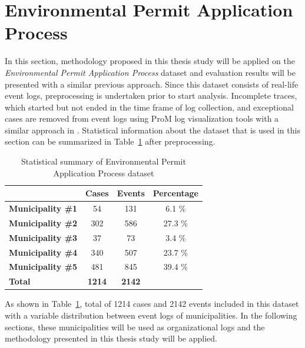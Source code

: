 \section{Environmental Permit Application Process}
\label{sec:environmental-permit-application-process}
In this section, methodology proposed in this thesis study will be applied on the \textit{Environmental Permit Application Process} dataset \cite{coselog-data} and evaluation results will be presented with a similar previous approach. Since this dataset consists of real-life event logs, preprocessing is undertaken prior to start analysis. Incomplete traces, which started but not ended in the time frame of log collection, and exceptional cases are removed from event logs using ProM log visualization tools with a similar approach in \cite{buijs2014flexible}. Statistical information about the dataset that is used in this section can be summarized in Table~\ref{table:coselog-process-summary} after preprocessing.

 \begin{table}[]
\centering
\caption{Statistical summary of Environmental Permit Application Process dataset}
\label{table:coselog-process-summary}
\begin{tabular}{lccc}
\hline
                       & {\bf Cases} & {\bf Events} & {\bf Percentage} \\ \hline
{\bf Municipality \#1} & 54          & 131          & 6.1 \%           \\ \hline
{\bf Municipality \#2} & 302         & 586          & 27.3 \%          \\ \hline
{\bf Municipality \#3} & 37          & 73           & 3.4 \%           \\ \hline
{\bf Municipality \#4} & 340         & 507          & 23.7 \%          \\ \hline
{\bf Municipality \#5} & 481         & 845          & 39.4 \%          \\
{\bf Total}            & {\bf 1214}  & {\bf 2142}   & {\bf }           \\ \hline
\end{tabular}
\end{table}

As shown in Table~\ref{table:coselog-process-summary}, total of 1214 cases and 2142 events included in this dataset with a variable distribution between event logs of municipalities. In the following sections, these municipalities will be used as organizational logs and the methodology presented in this thesis study will be applied.

